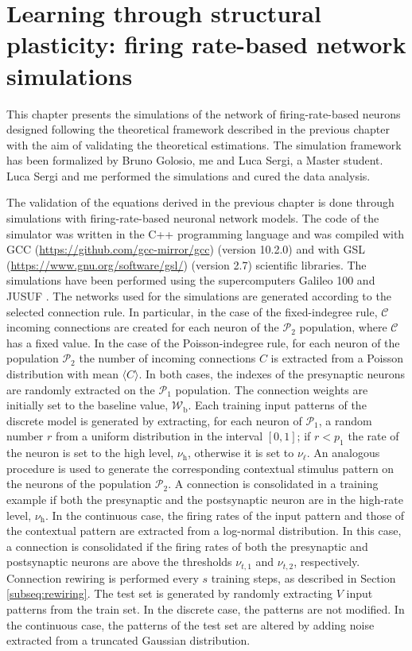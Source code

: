 \documentclass[a4paper, 12pt, twoside, openright]{book}
\newcommand{\popI}{\mathcal{P}_1}
\newcommand{\popII}{\mathcal{P}_2}
\newcommand{\rh}{\nu_\text{h}}
\newcommand{\rl}{\nu_{\ell}}
\newcommand{\C}{\mathcal{C}}
\newcommand{\Wb}{\mathcal{W}_\text{b}}
\begin{document}
\chapter{\textbf{Learning through structural plasticity: firing rate-based network simulations}}
\label{chapter:structural_plasticity_simulation}

\begin{tcolorbox}[colback=white,colframe=DarkRed,title=\textbf{Summary}]
This chapter presents the simulations of the network of firing-rate-based neurons designed following the theoretical framework described in the previous chapter with the aim of validating the theoretical estimations. The simulation framework has been formalized by Bruno Golosio, me and Luca Sergi, a Master student. Luca Sergi and me performed the simulations and cured the data analysis.
\end{tcolorbox}

The validation of the equations derived in the previous chapter is done through simulations with firing-rate-based neuronal network models.
The code of the simulator was written in the C++ programming language and was compiled with GCC (\url{https://github.com/gcc-mirror/gcc}) (version 10.2.0) and with GSL (\url{https://www.gnu.org/software/gsl/}) (version 2.7) scientific libraries.
The simulations have been performed using the supercomputers Galileo 100 and JUSUF \cite{JUSUF}.
The networks used for the simulations are generated according to the selected connection rule. In particular, in the case of the fixed-indegree rule, $\C$ incoming connections are created for each neuron of the $\popII$ population, where $\C$ has a fixed value.
In the case of the Poisson-indegree rule, for each neuron of the population $\popII$ the number of incoming connections $C$ is extracted from a Poisson distribution with mean $\langle C \rangle$.
In both cases, the indexes of the presynaptic neurons are randomly extracted on the $\popI$ population. 
The connection weights are initially set to the baseline value, $\Wb$.
Each training input patterns of the discrete model is generated by extracting, for each neuron of $\popI$, a random number $r$ from a uniform distribution in the interval $[0, 1]$; if $r<p_1$ the rate of the neuron is set to the high level, $\rh$, otherwise it is set to $\rl$.
An analogous procedure is used to generate the corresponding contextual stimulus pattern on the neurons of the population $\popII$.
A connection is consolidated in a training example if both the presynaptic and the postsynaptic neuron are in the high-rate level, $\rh$.
In the continuous case, the firing rates of the input pattern and those of the contextual pattern are extracted from a log-normal distribution. In this case, a connection is consolidated if the firing rates of both the presynaptic and postsynaptic neurons are above the thresholds $\nu_{t,1}$ and $\nu_{t,2}$, respectively.
Connection rewiring is performed every $s$ training steps, as described in Section \ref{subseq:rewiring}.
The test set is generated by randomly extracting $V$ input patterns from the train set. In the discrete case, the patterns are not modified. In the continuous case, the patterns of the test set are altered by adding noise extracted from a truncated Gaussian distribution.
\end{document}

